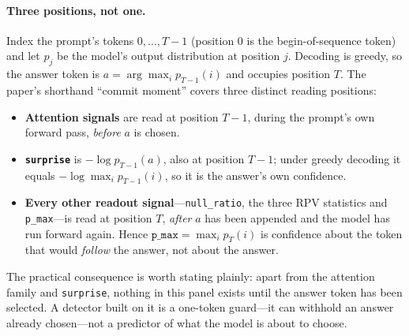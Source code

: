 \documentclass[11pt]{article}
\begin{document}
\paragraph{Three positions, not one.} Index the prompt's tokens $0,\dots,T-1$ (position $0$ is the
begin-of-sequence token) and let $p_j$ be the model's output distribution at position $j$. Decoding
is greedy, so the answer token is $a=\arg\max_i p_{T-1}(i)$ and occupies position $T$. The paper's
shorthand ``commit moment'' covers three distinct reading positions:
\begin{itemize}\setlength\itemsep{2pt}
\item \textbf{Attention signals} are read at position $T-1$, during the prompt's own forward pass,
\emph{before} $a$ is chosen.
\item \textbf{\texttt{surprise}} is $-\log p_{T-1}(a)$, also at position $T-1$; under greedy decoding
it equals $-\log\max_i p_{T-1}(i)$, so it is the answer's own confidence.
\item \textbf{Every other readout signal}---\texttt{null\_ratio}, the three RPV statistics and
\texttt{p\_max}---is read at position $T$, \emph{after} $a$ has been appended and the model has run
forward again. Hence $\texttt{p\_max}=\max_i p_T(i)$ is confidence about the token that would
\emph{follow} the answer, not about the answer.
\end{itemize}
The practical consequence is worth stating plainly: apart from the attention family and
\texttt{surprise}, nothing in this panel exists until the answer token has been selected. A detector
built on it is a one-token guard---it can withhold an answer already chosen---not a predictor of
what the model is about to choose.
\end{document}
